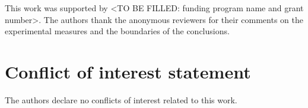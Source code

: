 \begin{acks}
This work was supported by <TO BE FILLED: funding program name and grant number>.
The authors thank the anonymous reviewers for their comments on the experimental measures and the boundaries of the conclusions.
\end{acks}

\section*{Conflict of interest statement}
The authors declare no conflicts of interest related to this work.





